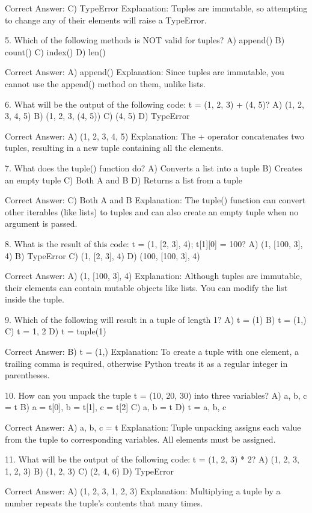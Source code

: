 Correct Answer: C) TypeError
Explanation: Tuples are immutable, so attempting to change any of their elements will raise a TypeError.

5. Which of the following methods is NOT valid for tuples?
A) append()
B) count()
C) index()
D) len()

Correct Answer: A) append()
Explanation: Since tuples are immutable, you cannot use the append() method on them, unlike lists.

6. What will be the output of the following code: t = (1, 2, 3) + (4, 5)?
A) (1, 2, 3, 4, 5)
B) (1, 2, 3, (4, 5))
C) (4, 5)
D) TypeError

Correct Answer: A) (1, 2, 3, 4, 5)
Explanation: The + operator concatenates two tuples, resulting in a new tuple containing all the elements.

7. What does the tuple() function do?
A) Converts a list into a tuple
B) Creates an empty tuple
C) Both A and B
D) Returns a list from a tuple

Correct Answer: C) Both A and B
Explanation: The tuple() function can convert other iterables (like lists) to tuples and can also create an empty tuple when no argument is passed.

8. What is the result of this code: t = (1, [2, 3], 4); t[1][0] = 100?
A) (1, [100, 3], 4)
B) TypeError
C) (1, [2, 3], 4)
D) (100, [100, 3], 4)

Correct Answer: A) (1, [100, 3], 4)
Explanation: Although tuples are immutable, their elements can contain mutable objects like lists. You can modify the list inside the tuple.

9. Which of the following will result in a tuple of length 1?
A) t = (1)
B) t = (1,)
C) t = 1, 2
D) t = tuple(1)

Correct Answer: B) t = (1,)
Explanation: To create a tuple with one element, a trailing comma is required, otherwise Python treats it as a regular integer in parentheses.

10. How can you unpack the tuple t = (10, 20, 30) into three variables?
A) a, b, c = t
B) a = t[0], b = t[1], c = t[2]
C) a, b = t
D) t = a, b, c

Correct Answer: A) a, b, c = t
Explanation: Tuple unpacking assigns each value from the tuple to corresponding variables. All elements must be assigned.

11. What will be the output of the following code: t = (1, 2, 3) * 2?
A) (1, 2, 3, 1, 2, 3)
B) (1, 2, 3)
C) (2, 4, 6)
D) TypeError

Correct Answer: A) (1, 2, 3, 1, 2, 3)
Explanation: Multiplying a tuple by a number repeats the tuple's contents that many times.

